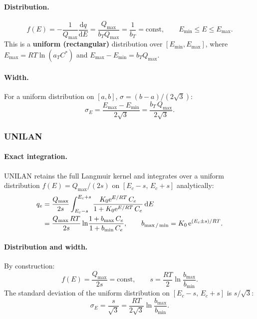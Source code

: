 \documentclass[journal=aamick,manuscript=article]{achemso}
\begin{document}
\paragraph{Distribution.}
\begin{equation}
	f(E) = -\frac{1}{Q_{\max}}\frac{\mathrm{d}q}{\mathrm{d}E}
	= \frac{Q_{\max}}{b_T Q_{\max}} = \frac{1}{b_T} = \text{const},
	\qquad E_{\min} \leq E \leq E_{\max}.
	\label{eq:si_fE_temkin}
\end{equation}
This is a \textbf{uniform (rectangular)} distribution over $[E_{\min}, E_{\max}]$,
where $E_{\max} = RT\ln(a_T C^{\ast})$ and $E_{\max} - E_{\min} = b_T Q_{\max}$.

\paragraph{Width.}
For a uniform distribution on $[a,b]$, $\sigma = (b-a)/(2\sqrt{3})$:
\begin{equation}
	\sigma_E = \frac{E_{\max}-E_{\min}}{2\sqrt{3}}
	= \frac{b_T\,Q_{\max}}{2\sqrt{3}}.
	\label{eq:si_sigmaE_temkin}
\end{equation}

\subsubsection{UNILAN}

\paragraph{Exact integration.}
UNILAN retains the full Langmuir kernel and integrates over a uniform distribution
$f(E) = Q_{\max}/(2s)$ on $[E_c-s,\,E_c+s]$ analytically:
\begin{align}
	q_e &= \frac{Q_{\max}}{2s}\int_{E_c-s}^{E_c+s}
	\frac{K_0\mathrm{e}^{E/RT}\,C_e}{1+K_0\mathrm{e}^{E/RT}\,C_e}\,\mathrm{d}E
	\notag \\
	&= \frac{Q_{\max}\,RT}{2s}
	\ln\!\frac{1+b_{\max}\,C_e}{1+b_{\min}\,C_e},
	\qquad b_{\max/\min} = K_0\,\mathrm{e}^{(E_c\pm s)/RT}.
\end{align}

\paragraph{Distribution and width.}
By construction:
\begin{equation}
	f(E) = \frac{Q_{\max}}{2s} = \text{const},
	\qquad s = \frac{RT}{2}\ln\!\frac{b_{\max}}{b_{\min}}.
	\label{eq:si_fE_unilan}
\end{equation}
The standard deviation of the uniform distribution on $[E_c-s,\,E_c+s]$ is $s/\sqrt{3}$:
\begin{equation}
	\sigma_E = \frac{s}{\sqrt{3}}
	= \frac{RT}{2\sqrt{3}}\ln\!\frac{b_{\max}}{b_{\min}}.
	\label{eq:si_sigmaE_unilan}
\end{equation}
\end{document}
